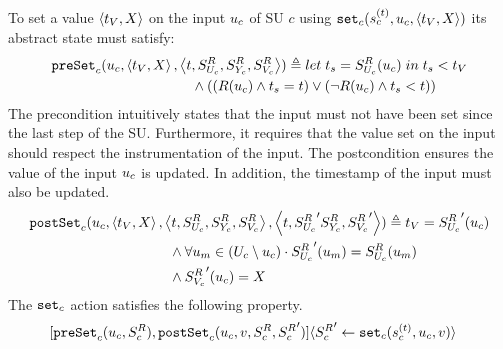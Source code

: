 \begin{definition}\label{def:setin}
  To set a value $ \left\langle t_{V}, X \right\rangle $ on the input $u_{c}$ of SU $c$ using $\mathtt{set}_{c}(s_{c}^{(t)}, u_{c},  \left\langle t_{V}, X \right\rangle )$ its abstract state must satisfy:
    \begin{align*}
      &\mathtt{preSet}_{c}(u_{c},  \left\langle t_{V},X \right\rangle ,  \left\langle t,S^{R}_{U_{c}}, S^{R}_{Y_{c}}, S^{R}_{V_c} \right\rangle ) \triangleq 
      let\; t_s = S^{R}_{U_{c}}(u_{c}) \; in \; t_s < t_{V} \nonumber \\
      & \qquad \qquad \qquad \qquad \qquad
      \land 
      ((R(u_{c}) \land t_s = t) 
      \lor (\neg R(u_{c}) \land t_s < t))
    \end{align*}
    The precondition intuitively states that the input must not have been set since the last step of the SU.
    Furthermore, it requires that the value set on the input should respect the instrumentation of the input.
    The postcondition ensures the value of the input $u_{c}$  is updated. In addition, the timestamp of the input must also be updated.
    \begin{align*}
      &\mathtt{postSet}_{c}(u_{c},  \left\langle t_{V},X \right\rangle ,  \left\langle t,S^{R}_{U_{c}}, S^{R}_{Y_{c}}, S^{R}_{V_c} \right\rangle , 
       \left\langle t, {S^{R}_{U_{c}}}' S^{R}_{Y_{c}}, {S^{R}_{V_c}}' \right\rangle ) \triangleq 
      t_{V} = {S^{R}_{U_{c}}}'(u_{c})
      \nonumber\\
      &\qquad \qquad \qquad \qquad \qquad \land
      \forall u_{m} \in (U_{c} \setminus u_{c}) \cdot 
      {S^{R}_{U_{c}}}'(u_{m}) =
      S^{R}_{U_{c}}(u_{m}) 
      \nonumber \\
      &\qquad \qquad \qquad \qquad \qquad \land
      {S^{R}_{V_c}}'(u_{c}) = X 
    \end{align*}
    The $\mathtt{set}_{c}$ action satisfies the following property.
    \begin{align*}
      &[\mathtt{preSet}_{c}(u_{c}, S^{R}_{c}), 
      \mathtt{postSet}_{c}(u_{c}, v, S^{R}_{c}, {S^{R}_{c}}')] 
      \langle {S^{R}_{c}}' \gets \mathtt{set}_{c}(s_{c}^{(t)},u_{c}, v) \rangle \nonumber
    \end{align*}
  \end{definition}

